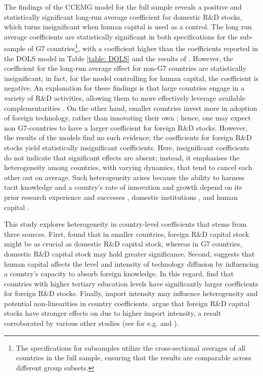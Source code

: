\documentclass[12pt]{article}
\begin{document}
The findings of the CCEMG model for the full sample reveals a positive and statistically significant long-run average coefficient for domestic R\&D stocks, which turns insignificant when human capital is used as a control. The long run average coefficients are statistically significant in both specifications for the sub-sample of G7 countries\footnote{The specifications for subsamples utilize the cross-sectional averages of all countries in the full sample, ensuring that the results are comparable across different group subsets.}, with a coefficient higher than the coefficients reported in the DOLS model in Table \ref{table: DOLS} and the results of \citet{Coe2009}. However, the coefficient for the long-run average effect for non-G7 countries are statistically insignificant; in fact, for the model controlling for human capital, the coefficient is negative. An explanation for these findings is that large countries engage in a variety of R\&D activities, allowing them to more effectively leverage available complementarities \citep{Coe1995}. On the other hand, smaller countries invest more in adoption of foreign technology, rather than innovating their own \citep{Santacreu2015}; hence, one may expect non G7-countries to have a larger coefficient for foreign R\&D stocks. However, the results of the models find no such evidence; the coefficients for foreign R\&D stocks yield statistically insignificant coefficients. Here, insignificant coefficients do not indicate that significant effects are absent; instead, it emphasises the heterogeneity among countries, with varying dynamics, that tend to cancel each other out on average. Such heterogeneity arises because the ability to harness tacit knowledge and a country's rate of innovation and growth depend on its prior research experience and successes \citep{Mancusi2008}, domestic institutions \citep{Coe2009}, and human capital \citep{Kneller2006}.

This study explores heterogeneity in country-level coefficients that stems from three sources. First, \citet{Coe1995} found that in smaller countries, foreign R\&D capital stock might be as crucial as domestic R\&D capital stock, whereas in G7 countries, domestic R\&D capital stock may hold greater significance. Second, \citet{Nelson1966} suggests that human capital affects the level and intensity of technology diffusion by influencing a country's capacity to absorb foreign knowledge. In this regard, \citet{Coe2009} find that countries with higher tertiary education levels have significantly larger coefficients for foreign R\&D stocks. Finally, import intensity may influence heterogeneity and potential non-linearities in country coefficients. \citet{Lichtenberg1998} argue that foreign R\&D capital stocks have stronger effects on due to higher import intensity, a result corroborated by various other studies (see for e.g. \citet{Coe2009} and \citet{Madsen2007}).
\end{document}
